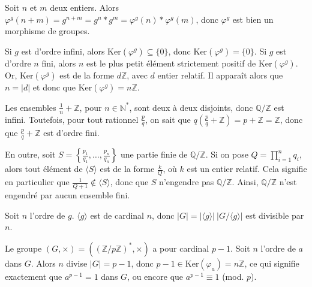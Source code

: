 \begin{sol}
Soit $n$ et $m$ deux entiers. Alors
$\varphi^g(n+m) = g^{n+m} = g^n \ast g^m = \varphi^g(n) \ast \varphi^g(m)$,
donc $\varphi^g$ est bien un morphisme de groupes.

Si $g$ est d'ordre infini, alors $\mathrm{Ker}(\varphi^g) \subseteq \{0\}$, donc
$\mathrm{Ker}(\varphi^g) = \{0\}$.
Si $g$ est d'ordre $n$ fini,
alors $n$ est le plus petit élément strictement positif de $\mathrm{Ker}(\varphi^g)$.
Or, $\mathrm{Ker}(\varphi^g)$ est de la forme $d \mathbb{Z}$, avec $d$ entier relatif.
Il apparaît alors que $n = \vert d \vert$ et donc que $\mathrm{Ker}(\varphi^g) = n \mathbb{Z}$.
\end{sol}

\begin{sol}
Les ensembles $\frac{1}{n} + \mathbb{Z}$, pour $n \in \mathbb{N}^\ast$, sont deux à deux disjoints, donc
$\mathbb{Q}/\mathbb{Z}$ est infini.
Toutefois, pour tout rationnel $\frac{p}{q}$, on sait que
$q\left(\frac{p}{q} + \mathbb{Z}\right) = p + \mathbb{Z} = \mathbb{Z}$, donc que $\frac{p}{q} + \mathbb{Z}$ est d'ordre fini.

En outre, soit $S = \left\{\frac{p_1}{q_1},\dots,\frac{p_n}{q_n}\right\}$ une partie finie de $\mathbb{Q}/\mathbb{Z}$.
Si on pose $Q = \prod_{i=1}^n q_i$, alors tout élément de $\langle S \rangle$
est de la forme $\frac{k}{Q}$, où $k$ est un entier relatif. Cela signifie en particulier que
$\frac{1}{Q+1} \notin \langle S \rangle$, donc que $S$ n'engendre pas $\mathbb{Q}/\mathbb{Z}$.
Ainsi, $\mathbb{Q}/\mathbb{Z}$ n'est engendré par aucun ensemble fini.
\end{sol}

\begin{sol}
Soit $n$ l'ordre de $g$.
$\langle g \rangle$ est de cardinal $n$, donc
$\vert G \vert = \vert \langle g \rangle \vert ~ \vert G / \langle g \rangle \vert$
est divisible par $n$.
\end{sol}

\begin{sol}
Le groupe $(G,\times) = ((\mathbb{Z}/p\mathbb{Z})^\ast, \times)$ a pour cardinal $p-1$.
Soit $n$ l'ordre de $a$ dans $G$.
Alors $n$ divise $\vert G \vert = p-1$, donc
$p-1 \in \mathrm{Ker}(\varphi_a) = n \mathbb{Z}$, ce qui signifie exactement que
$a^{p-1} = 1$ dans $G$, ou encore que $a^{p-1} \equiv 1$ (mod. $p$).
\end{sol}
